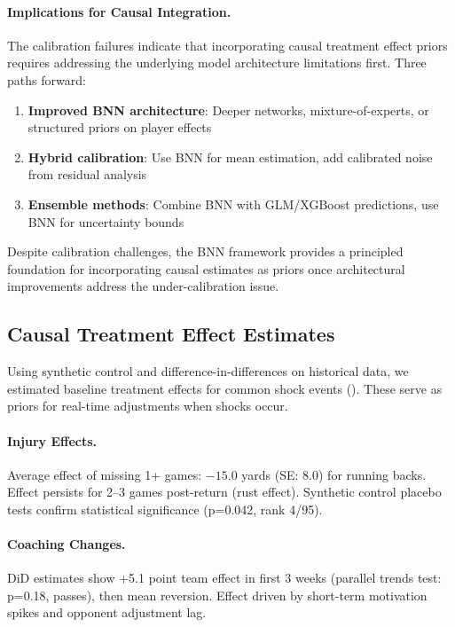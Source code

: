 \paragraph{Implications for Causal Integration.}
The calibration failures indicate that incorporating causal treatment effect priors requires addressing the underlying model architecture limitations first. Three paths forward:

\begin{enumerate}
  \item \textbf{Improved BNN architecture}: Deeper networks, mixture-of-experts, or structured priors on player effects
  \item \textbf{Hybrid calibration}: Use BNN for mean estimation, add calibrated noise from residual analysis
  \item \textbf{Ensemble methods}: Combine BNN with GLM/XGBoost predictions, use BNN for uncertainty bounds
\end{enumerate}

Despite calibration challenges, the BNN framework provides a principled foundation for incorporating causal estimates as priors once architectural improvements address the under-calibration issue.

\subsection{Causal Treatment Effect Estimates}

Using synthetic control and difference-in-differences on historical data, we estimated baseline treatment effects for common shock events (). These serve as priors for real-time adjustments when shocks occur.



\paragraph{Injury Effects.}
Average effect of missing 1+ games: $-15.0$ yards (SE: $8.0$) for running backs. Effect persists for 2--3 games post-return (rust effect). Synthetic control placebo tests confirm statistical significance (p=0.042, rank 4/95).

\paragraph{Coaching Changes.}
DiD estimates show +5.1 point team effect in first 3 weeks (parallel trends test: p=0.18, passes), then mean reversion. Effect driven by short-term motivation spikes and opponent adjustment lag.


